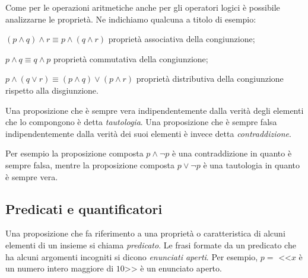 Come per le operazioni aritmetiche anche per gli operatori logici è possibile analizzarne le proprietà. Ne indichiamo qualcuna a titolo di esempio:
\begin{itemize*}
\item $(p\wedge q)\wedge r\equiv p\wedge (q\wedge r)$ proprietà associativa della congiunzione;
\item $p\wedge q\equiv q\wedge p$ proprietà commutativa della congiunzione;
\item $p\wedge (q\vee r)\equiv (p\wedge q)\vee (p\wedge r)$ proprietà distributiva della congiunzione rispetto alla disgiunzione.
\end{itemize*}

Una proposizione che è sempre vera indipendentemente dalla verità degli elementi che lo compongono è detta \emph{tautologia}. Una proposizione che è sempre falsa indipendentemente dalla verità dei suoi elementi è invece detta \emph{contraddizione}.

Per esempio la proposizione composta  $p\wedge \neg p$ è una contraddizione in quanto è sempre falsa, mentre la proposizione composta  $p\vee \neg p$ è una tautologia in quanto è sempre vera.

\subsection{Predicati e quantificatori}

Una proposizione che fa riferimento a una proprietà o caratteristica di alcuni elementi di un insieme si chiama \emph{predicato}. Le frasi formate da un predicato che ha alcuni argomenti incogniti si dicono \emph{enunciati aperti}.
Per esempio, $ p = $ <<$ x $ è un numero intero maggiore di $ 10 $>> è un enunciato aperto.

